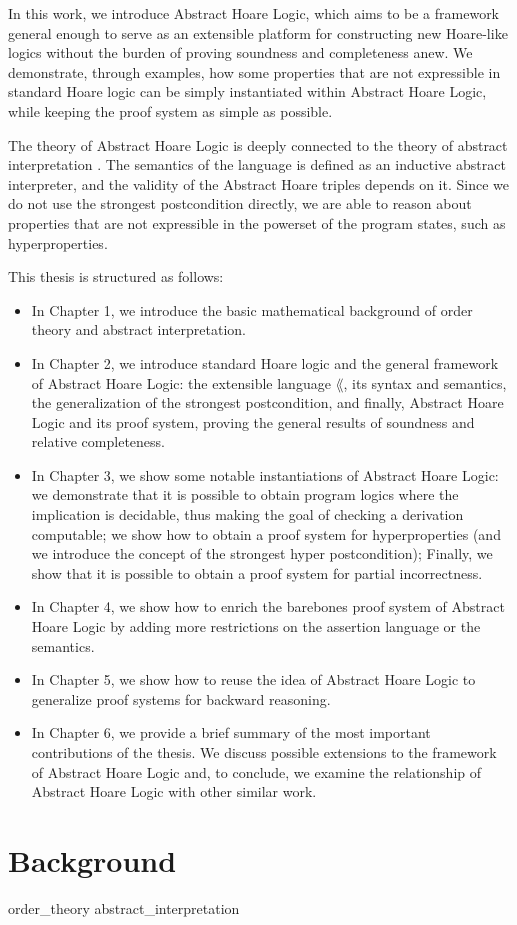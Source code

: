 In this work, we introduce Abstract Hoare Logic, which aims to be a framework
general enough to serve as an extensible platform for constructing new
Hoare-like logics without the burden of proving soundness and completeness
anew. We demonstrate, through examples, how some properties that are not
expressible in standard Hoare logic can be simply instantiated within Abstract
Hoare Logic, while keeping the proof system as simple as possible.

The theory of Abstract Hoare Logic is deeply connected to the theory of
abstract interpretation \cite{Cousot77}. The semantics of the language is
defined as an inductive abstract interpreter, and the validity of the Abstract
Hoare triples depends on it. Since we do not use the strongest postcondition
directly, we are able to reason about properties that are not expressible in
the powerset of the program states, such as hyperproperties.

This thesis is structured as follows:
\begin{itemize}
  \item In Chapter 1, we introduce the basic mathematical background of order
    theory and abstract interpretation.

  \item In Chapter 2, we introduce standard Hoare logic and the general
    framework of Abstract Hoare Logic: the extensible language $\lang$, its
    syntax and semantics, the generalization of the strongest postcondition,
    and finally, Abstract Hoare Logic and its proof system, proving the general
    results of soundness and relative completeness.

  \item In Chapter 3, we show some notable instantiations of Abstract Hoare
    Logic: we demonstrate that it is possible to obtain program logics where
    the implication is decidable, thus making the goal of checking a derivation
    computable; we show how to obtain a proof system for hyperproperties (and
    we introduce the concept of the strongest hyper postcondition); Finally, we
    show that it is possible to obtain a proof system for partial
    incorrectness.

  \item In Chapter 4, we show how to enrich the barebones proof system of
    Abstract Hoare Logic by adding more restrictions on the assertion language
    or the semantics.

  \item In Chapter 5, we show how to reuse the idea of Abstract Hoare Logic to
    generalize proof systems for backward reasoning.

  \item In Chapter 6, we provide a brief summary of the most important
    contributions of the thesis. We discuss possible extensions to the
    framework of Abstract Hoare Logic and, to conclude, we examine the
    relationship of Abstract Hoare Logic with other similar work.
\end{itemize}

\chapter{Background}

{order_theory}
{abstract_interpretation}
